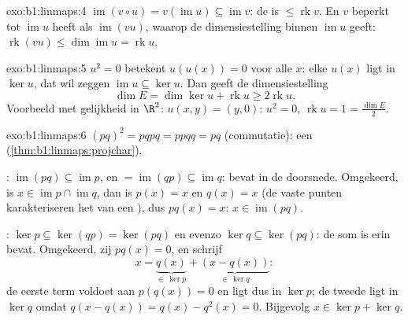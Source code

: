 \begin{solution}{exo:b1:linmaps:4}
$\operatorname{im}(v \circ u) = v(\operatorname{im} u) \subseteq
\operatorname{im} v$: de  is $\leq \operatorname{rk} v$. En $v$
beperkt tot $\operatorname{im} u$ heeft als 
$\operatorname{im}(vu)$, waarop de dimensiestelling binnen
$\operatorname{im} u$ geeft: $\operatorname{rk}(vu) \leq
\dim\operatorname{im} u = \operatorname{rk} u$.
\end{solution}

\begin{solution}{exo:b1:linmaps:5}
$u^2 = 0$ betekent $u(u(x)) = 0$ voor alle $x$: elke $u(x)$ ligt in
$\ker u$, dat wil zeggen $\operatorname{im} u \subseteq \ker u$.
Dan geeft de dimensiestelling
\[
\dim E = \dim\ker u + \operatorname{rk} u \geq 2\operatorname{rk} u .
\]
Voorbeeld met gelijkheid in $\R^2$: $u(x, y) = (y, 0)$: $u^2 = 0$,
$\operatorname{rk} u = 1 = \frac{\dim E}{2}$.
\end{solution}

\begin{solution}{exo:b1:linmaps:6}
$(pq)^2 = pqpq = ppqq = pq$ (commutatie): een 
(\cref{thm:b1:linmaps:projchar}).

: $\operatorname{im}(pq) \subseteq \operatorname{im} p$, en $=
\operatorname{im}(qp) \subseteq \operatorname{im} q$: bevat in de
doorsnede. Omgekeerd, is $x \in \operatorname{im} p \cap
\operatorname{im} q$, dan is $p(x) = x$ en $q(x) = x$ (de vaste
punten karakteriseren het  van een ), dus $pq(x) =
x$: $x \in \operatorname{im}(pq)$.

: $\ker p \subseteq \ker(qp) = \ker(pq)$ en evenzo $\ker q
\subseteq \ker(pq)$: de som is erin bevat. Omgekeerd, zij $pq(x) =
0$, en schrijf
\[
x = \underbrace{q(x)}_{\in\, \ker p} +
\underbrace{(x - q(x))}_{\in\, \ker q} :
\]
de eerste term voldoet aan $p(q(x)) = 0$ en ligt dus in $\ker p$; de
tweede ligt in $\ker q$ omdat $q(x - q(x)) = q(x) - q^2(x) = 0$.
Bijgevolg $x \in \ker p + \ker q$.
\end{solution}

